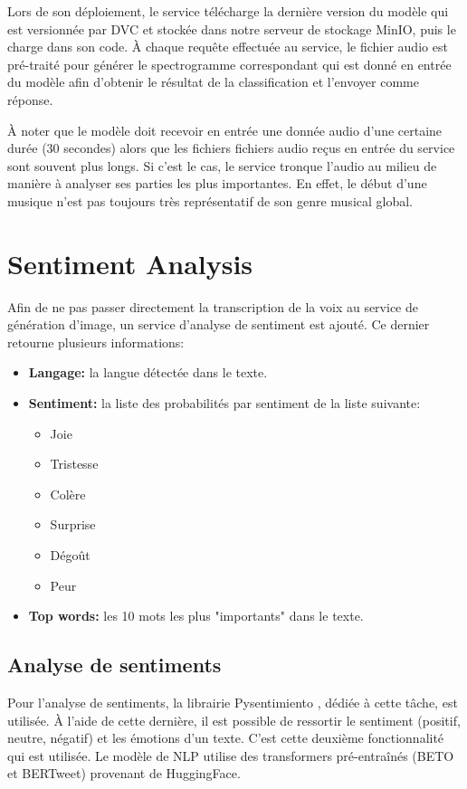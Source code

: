 Lors de son déploiement, le service télécharge la dernière version du modèle qui est versionnée par DVC et stockée dans notre serveur de stockage MinIO, puis le charge dans son code. À chaque requête effectuée au service, le fichier audio est pré-traité pour générer le spectrogramme correspondant qui est donné en entrée du modèle afin d'obtenir le résultat de la classification et l'envoyer comme réponse.

À noter que le modèle doit recevoir en entrée une donnée audio d'une certaine durée (30 secondes) alors que les fichiers fichiers audio reçus en entrée du service sont souvent plus longs. Si c'est le cas, le service tronque l'audio au milieu de manière à analyser ses parties les plus importantes. En effet, le début d'une musique n'est pas toujours très représentatif de son genre musical global.

\section{Sentiment Analysis}
Afin de ne pas passer directement la transcription de la voix au service de génération d'image, un service d'analyse de sentiment est ajouté. Ce dernier retourne plusieurs informations:

\begin{itemize}
    \item \textbf{Langage:} la langue détectée dans le texte.
    \item{\textbf{Sentiment:} la liste des probabilités par sentiment de la liste suivante:
        \begin{itemize}
            \item Joie
            \item Tristesse
            \item Colère
            \item Surprise
            \item Dégoût
            \item Peur
        \end{itemize}
    }
    \item \textbf{Top words:} les 10 mots les plus "importants" dans le texte.
\end{itemize}

\subsection{Analyse de sentiments}
Pour l'analyse de sentiments, la librairie Pysentimiento \cite{Pysentimiento}, dédiée à cette tâche, est utilisée. À l'aide de cette dernière, il est possible de ressortir le sentiment (positif, neutre, négatif) et les émotions d'un texte. C'est cette deuxième fonctionnalité qui est utilisée. Le modèle de NLP utilise des transformers pré-entraînés (BETO et BERTweet) provenant de HuggingFace.

